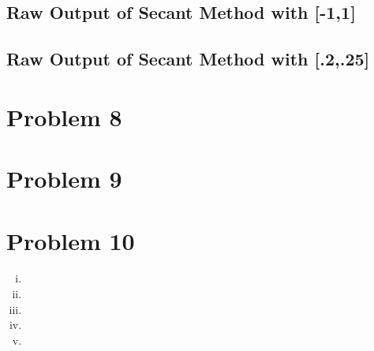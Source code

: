 \documentclass[11pt]{article} %
\begin{document}
\subsection*{Raw Output of Secant Method with [-1,1]}

\subsection*{Raw Output of Secant Method with [.2,.25]}

\section*{Problem 8}

\section*{Problem 9}

\section*{Problem 10}
\begin{enumerate}[i.)]
\item
\item
\item
\item
\item
\end{enumerate}
\end{document}
